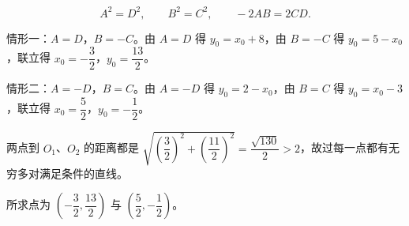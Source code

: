 \begin{answer}
\nopagebreak[4]
\[A^2=D^2,\qquad B^2=C^2,\qquad -2AB=2CD .\]

情形一：$A=D$，$B=-C$。由 $A=D$ 得 $y_0=x_0+8$，由 $B=-C$ 得 $y_0=5-x_0$，联立得 $x_0=-\dfrac32$，$y_0=\dfrac{13}2$。

情形二：$A=-D$，$B=C$。由 $A=-D$ 得 $y_0=2-x_0$，由 $B=C$ 得 $y_0=x_0-3$，联立得 $x_0=\dfrac52$，$y_0=-\dfrac12$。

两点到 $O_1$、$O_2$ 的距离都是 $\sqrt{\left(\dfrac32\right)^2+\left(\dfrac{11}2\right)^2}=\dfrac{\sqrt{130}}2>2$，故过每一点都有无穷多对满足条件的直线。

所求点为 $\left(-\dfrac32,\dfrac{13}2\right)$ 与 $\left(\dfrac52,-\dfrac12\right)$。


\end{answer}
